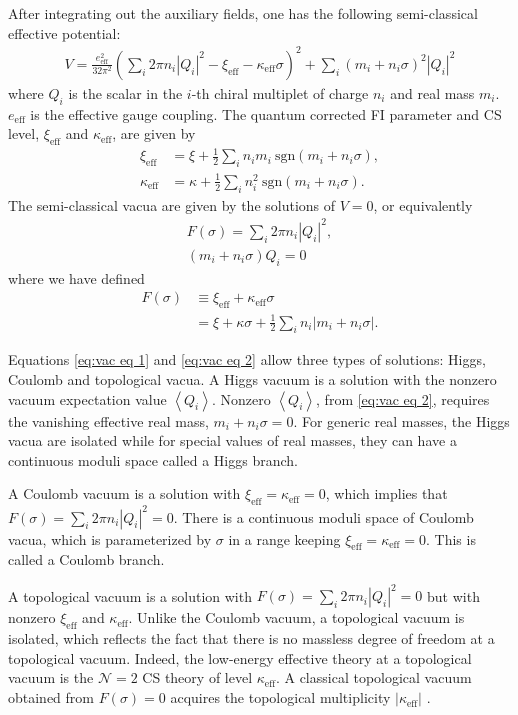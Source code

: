\documentclass[a4paper,11pt]{article}
\begin{document}
After integrating out the auxiliary fields, one has the following semi-classical effective potential:
\begin{align}
V = \frac{e_\text{eff}^2}{32 \pi^2} \left(\sum_i 2 \pi n_i |Q_i|^2-\xi_\text{eff}-\kappa_\text{eff} \sigma\right)^2+\sum_i (m_i+n_i \sigma)^2 |Q_i|^2
\end{align}
where $Q_i$ is the scalar in the $i$-th chiral multiplet of charge $n_i$ and real mass $m_i$. $e_\text{eff}$ is the effective gauge coupling. The quantum corrected FI parameter and CS level, $\xi_\text{eff}$ and $\kappa_\text{eff}$, are given by
\begin{align}
\xi_\text{eff} &= \xi+\frac{1}{2} \sum_i n_i m_i ~ \textrm{sgn} (m_i+n_i \sigma), \\
\kappa_\text{eff} &= \kappa+\frac{1}{2} \sum_i n_i^2 ~ \textrm{sgn} (m_i+n_i \sigma).
\end{align}
The semi-classical vacua are given by the solutions of $V = 0$, or equivalently
\begin{gather}
F(\sigma) = \sum_i 2 \pi n_i |Q_i|^2, \label{eq:vac eq 1}\\
(m_i+n_i \sigma) Q_i = 0 \label{eq:vac eq 2}
\end{gather}
where we have defined
\begin{align}
F(\sigma) &\equiv \xi_\text{eff}+\kappa_\text{eff} \sigma \\
&= \xi+\kappa \sigma+\frac{1}{2} \sum_i n_i |m_i+n_i \sigma|. \label{eq:F}
\end{align}

Equations \eqref{eq:vac eq 1} and \eqref{eq:vac eq 2} allow three types of solutions: Higgs, Coulomb and topological vacua. A Higgs vacuum is a solution with the nonzero vacuum expectation value $\left<Q_i\right>$. Nonzero $\left<Q_i\right>$, from \eqref{eq:vac eq 2}, requires the vanishing effective real mass, $m_i+n_i \sigma = 0$. For generic real masses, the Higgs vacua are isolated while for special values of real masses, they can have a continuous moduli space called a Higgs branch.

A Coulomb vacuum is a solution with $\xi_\text{eff} = \kappa_\text{eff} = 0$, which implies that $F(\sigma) = \sum_i 2 \pi n_i |Q_i|^2 = 0$. There is a continuous moduli space of Coulomb vacua, which is parameterized by $\sigma$ in a range keeping $\xi_\text{eff} = \kappa_\text{eff} = 0$. This is called a Coulomb branch.

A topological vacuum is a solution with $F(\sigma) = \sum_i 2 \pi n_i |Q_i|^2 = 0$ but with nonzero $\xi_\text{eff}$ and $\kappa_\text{eff}$. Unlike the Coulomb vacuum, a topological vacuum is isolated, which reflects the fact that there is no massless degree of freedom at a topological vacuum. Indeed, the low-energy effective theory at a topological vacuum is the $\mathcal N = 2$ CS theory of level $\kappa_\text{eff}$. A classical topological vacuum obtained from $F(\sigma) = 0$ acquires the topological multiplicity $|\kappa_\text{eff}|$ \cite{Witten:1999ds,Intriligator:2013lca}.
\\
\end{document}
